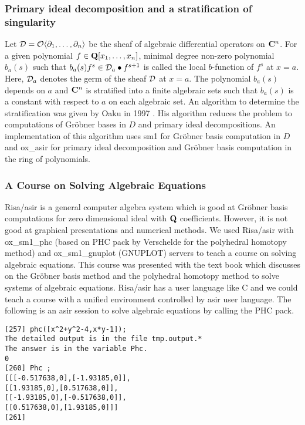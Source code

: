 \subsubsection{Primary ideal decomposition and
a stratification of singularity}
Let ${\cal D} = {\cal O}\langle \partial_{1}, \ldots, \partial_{n} \rangle$
be the sheaf of algebraic differential operators on ${\bf C}^n$.
For a given polynomial
$f \in {\bf Q}[x_1, \ldots, x_n]$,
minimal degree non-zero polynomial $b_a(s)$ such that
$ b_a(s) f^s \in {\cal D}_{a} \bullet f^{s+1} $
is called the local $b$-function of $f^s$ at
$x=a$.
Here, ${\cal D}_a$ denotes the germ of the sheaf ${\cal D}$ at
$x=a$.
The polynomial $b_a(s)$ depends on $a$ and ${\bf C}^n$ is
stratified into a finite algebraic sets such that
$b_a(s)$ is a constant with respect to $a$ on each 
algebraic set.
An algorithm to determine the stratification
was given by Oaku in 1997 \cite{oaku-advance}.
His algorithm reduces the problem to computations of Gr\"obner bases
in $D$ and primary ideal decompositions.
An implementation of this algorithm 
uses sm1 for Gr\"obner basis computation in $D$ and 
ox\_asir for primary ideal decomposition and Gr\"obner basis computation
in the ring of polynomials.

\subsubsection{A Course on Solving Algebraic Equations}

Risa/asir \cite{asir} is a general computer algebra system
which is good at Gr\"obner basis computations for zero dimensional ideal
with ${\bf Q}$ coefficients.
However, it is not good at graphical presentations and
numerical methods.
We used Risa/asir with ox\_sm1\_phc (based on PHC pack by Verschelde \cite{phc}
for the polyhedral homotopy method) and
ox\_sm1\_gnuplot (GNUPLOT) servers
to teach a course on solving algebraic equations.
This course was presented with the text book \cite{CLO} which discusses
on the Gr\"obner basis method and the polyhedral homotopy method
to solve systems of algebraic equations.
Risa/asir has a user language like C and we could teach a course
with a unified environment
controlled by asir user language.
The following is an asir session to solve algebraic equations by calling
the PHC pack.
\begin{verbatim}
[257] phc([x^2+y^2-4,x*y-1]);
The detailed output is in the file tmp.output.*
The answer is in the variable Phc.
0
[260] Phc ;
[[[-0.517638,0],[-1.93185,0]],
[[1.93185,0],[0.517638,0]],
[[-1.93185,0],[-0.517638,0]],
[[0.517638,0],[1.93185,0]]]
[261] 
\end{verbatim}



